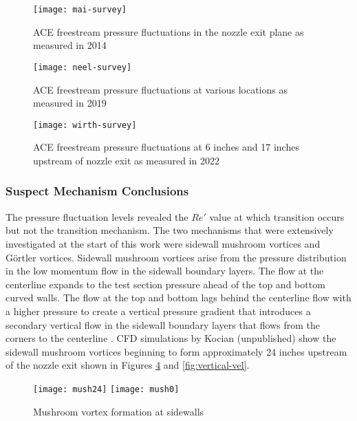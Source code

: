 \begin{figure}[ht!]
    \centering
    \texttt{[image: mai-survey]}
    \caption[ACE freestream pressure fluctuations in the nozzle exit plane as measured in 2014]{ACE freestream pressure fluctuations in the nozzle exit plane as measured in 2014 \cite{mai-dis}}
    \label{fig:mai-survey}
\end{figure}

\begin{figure}[ht!]
    \centering
    \texttt{[image: neel-survey]}
    \caption[ACE freestream pressure fluctuations at various locations as measured ii 2019]{ACE freestream pressure fluctuations at various locations as measured in 2019 \cite{neel-dis}}
    \label{fig:neel-survey}
\end{figure}

\begin{figure}[ht!]
    \centering
    \texttt{[image: wirth-survey]}
    \caption{ACE freestream pressure fluctuations at 6 inches and 17 inches upstream of nozzle exit as measured in 2022}
    \label{fig:wirth-survey}
\end{figure}

\subsubsection*{Suspect Mechanism Conclusions}

The pressure fluctuation levels revealed the $Re'$ value at which transition occurs but not the transition mechanism. The two mechanisms that were extensively investigated at the start of this work were sidewall mushroom vortices and Görtler vortices. Sidewall mushroom vortices arise from the pressure distribution in the low momentum flow in the sidewall boundary layers. The flow at the centerline expands to the test section pressure ahead of the top and bottom curved walls. The flow at the top and bottom lags behind the centerline flow with a higher pressure to create a vertical pressure gradient that introduces a secondary vertical flow in the sidewall boundary layers that flows from the corners to the centerline \cite{sabnis}. CFD simulations by Kocian (unpublished) show the sidewall mushroom vortices beginning to form approximately 24 inches upstream of the nozzle exit shown in Figures \ref{fig:mushrooms} and \ref{fig:vertical-vel}. 
\begin{figure}[ht!]
    \centering
    \texttt{[image: mush24]}
    \texttt{[image: mush0]}
    \caption{Mushroom vortex formation at sidewalls}
    \label{fig:mushrooms}
\end{figure}

